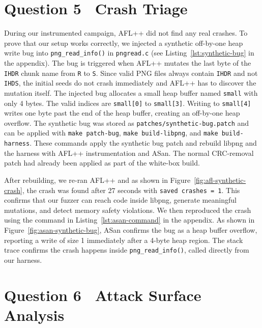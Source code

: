 \documentclass[letterpaper,twocolumn,10pt]{article}
\begin{document}
\section{Question 5 \textendash\ Crash Triage}
During our instrumented campaign, AFL++ did not find any real crashes. To prove that our setup works correctly, we injected a synthetic off-by-one heap write bug into \texttt{png\_read\_info()} in \texttt{pngread.c} (see Listing~\ref{lst:synthetic-bug} in the appendix). The bug is triggered when AFL++ mutates the last byte of the \texttt{IHDR} chunk name from \texttt{R} to \texttt{S}. Since valid PNG files always contain \texttt{IHDR} and not \texttt{IHDS}, the initial seeds do not crash immediately and AFL++ has to discover the mutation itself. The injected bug allocates a small heap buffer named \texttt{small} with only 4 bytes. The valid indices are \texttt{small[0]} to \texttt{small[3]}. Writing to \texttt{small[4]} writes one byte past the end of the heap buffer, creating an off-by-one heap overflow. The synthetic bug was stored as \texttt{patches/synthetic-bug.patch} and can be applied with \texttt{make patch-bug}, \texttt{make build-libpng}, and \texttt{make build-harness}. These commands apply the synthetic bug patch and rebuild libpng and the harness with AFL++ instrumentation and ASan. The normal CRC-removal patch had already been applied as part of the white-box build.


After rebuilding, we re-ran AFL++ and as shown in Figure~\ref{fig:afl-synthetic-crash}, the crash was found after 27 seconds with \texttt{saved crashes = 1}. This confirms that our fuzzer can reach code inside libpng, generate meaningful mutations, and detect memory safety violations. We then reproduced the crash using the command in Listing~\ref{lst:asan-command} in the appendix. As shown in Figure~\ref{fig:asan-synthetic-bug}, ASan confirms the bug as a heap buffer overflow, reporting a write of size 1 immediately after a 4-byte heap region. The stack trace confirms the crash happens inside \texttt{png\_read\_info()}, called directly from our harness.

\section{Question 6 \textendash\ Attack Surface Analysis}
\end{document}
